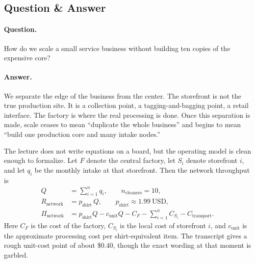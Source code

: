 \subsection{Question \& Answer}

\paragraph{Question.} How do we scale a small service business without building ten copies of the expensive core?

\paragraph{Answer.} We separate the edge of the business from the center. The storefront is not the true production site. It is a collection point, a tagging-and-bagging point, a retail interface. The factory is where the real processing is done. Once this separation is made, scale ceases to mean ``duplicate the whole business'' and begins to mean ``build one production core and many intake nodes.''

\begin{figure}[h]
\centering
{}
\end{figure}

The lecture does not write equations on a board, but the operating model is clean enough to formalize. Let $F$ denote the central factory, let $S_i$ denote storefront $i$, and let $q_i$ be the monthly intake at that storefront. Then the network throughput is
\begin{align}
Q &= \sum_{i=1}^{n} q_i, \qquad n_{\text{cleaners}} = 10, \\
R_{\text{network}} &= p_{\text{shirt}}\,Q, \qquad p_{\text{shirt}} \approx 1.99\ \text{USD}, \\
\Pi_{\text{network}} &= p_{\text{shirt}}Q - c_{\text{unit}}Q - C_F - \sum_{i=1}^{n} C_{S_i} - C_{\text{transport}}.
\end{align}
Here $C_F$ is the cost of the factory, $C_{S_i}$ is the local cost of storefront $i$, and $c_{\text{unit}}$ is the approximate processing cost per shirt-equivalent item. The transcript gives a rough unit-cost point of about \$0.40, though the exact wording at that moment is garbled.

